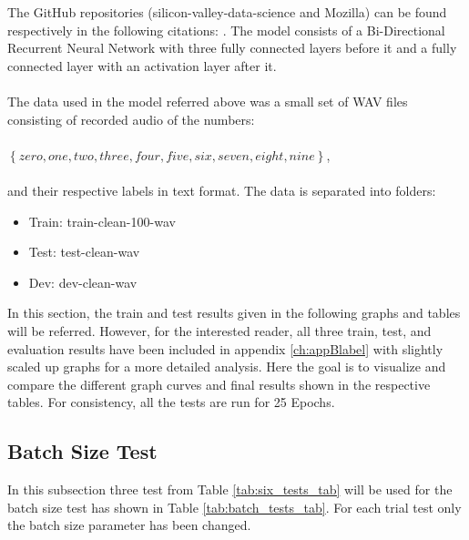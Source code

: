 The GitHub repositories (silicon-valley-data-science and Mozilla)
can be found respectively in the following citations:
\cite{rubashkin2017, mozilla2017}.
The model consists of a Bi-Directional Recurrent Neural Network
with three fully connected layers before it and a fully connected
layer with an activation layer after it.\\\\
The data used in the model referred above was a small set of WAV files consisting of recorded audio of the numbers:\\\\
$\left\{zero, one, two, three, four, five, six, seven, eight, nine \right\}$,\\\\
and their respective labels in text format. The data is separated into folders:
\begin{itemize}
    \item Train: train-clean-100-wav
    \item Test: test-clean-wav
    \item Dev: dev-clean-wav
\end{itemize}
In this section, the train and test results given in the following graphs and tables will be referred. However, for the interested
reader, all three train, test, and evaluation
results have been included in appendix \ref{ch:appBlabel} with slightly scaled up graphs for a more detailed analysis.
Here the goal is to visualize and compare the different graph curves and final results shown in the respective tables.
For consistency, all the tests are run for 25 Epochs. 

\subsection{Batch Size Test}
In this subsection three test from Table \ref{tab:six_tests_tab}  
will be used for the batch size test has shown in Table \ref{tab:batch_tests_tab}. For each trial test only the batch size parameter has been changed.


